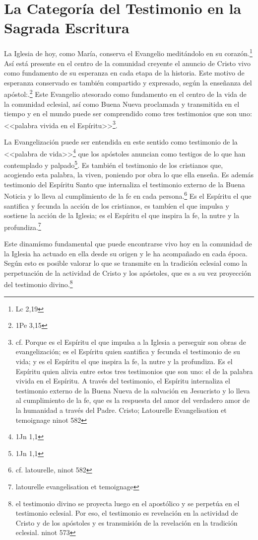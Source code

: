 \section{La Categoría del Testimonio en la Sagrada Escritura}
La Iglesia de hoy, como María, conserva el Evangelio meditándolo en su
corazón.\footnote{Lc 2,19} Así está presente en el centro de la comunidad
creyente el anuncio de Cristo vivo como fundamento de su esperanza en cada etapa
de la historia. Este motivo de esperanza conservado es también compartido y
expresado, según la enseñanza del apóstol:.\footnote{1Pe 3,15} Este Evangelio
atesorado como fundamento en el centro de la vida de la comunidad eclesial, así
como Buena Nueva proclamada y transmitida en el tiempo y en el mundo puede ser
comprendido como tres testimonios que son uno:<<palabra vivida en el
Espíritu>>\footnote{cf. Porque es el Espíritu el que impulsa a la Iglesia a
  perseguir son obras de evangelización; es el Espíritu quien santifica y
  fecunda el testimonio de su vida; y es el Espíritu el que inspira la fe, la
  nutre y la profundiza. Es el Espíritu quien alivia entre estos tres
  testimonios que son uno: el de la palabra vivida en el Espíritu. A través del
  testimonio, el Espíritu internaliza el testimonio externo de la Buena Nueva de
  la salvación en Jesucristo y lo lleva al cumplimiento de la fe, que es la
  respuesta del amor del verdadero amor de la humanidad a través del Padre.
  Cristo; Latourelle Evangelisation et temoignage ninot 582}.

La Evangelización puede ser entendida en este sentido como testimonio de la
<<palabra de vida>>\footnote{1Jn 1,1} que los apóstoles anuncian como testigos
de lo que han contemplado y palpado\footnote{1Jn 1,1}. Es también el testimonio
de los cristianos que, acogiendo esta palabra, la viven,
poniendo por obra lo que ella enseña. Es además testimonio del Espíritu Santo
que internaliza el testimonio externo de la Buena Noticia y lo lleva al
cumplimiento de la fe en cada persona.\footnote{cf. latourelle, ninot 582} Es el
Espíritu el que santifica y fecunda la acción de los cristianos, es tambíen el
que impulsa y sostiene la acción de la Iglesia; es el Espíritu el que inspira la
fe, la nutre y la profundiza.\footnote{latourelle evangelisation et temoignage}

Este dinamísmo fundamental que puede encontrarse vivo hoy en la comunidad de la
Iglesia ha actuado en ella desde su origen y le ha acompañado en cada época.
Según esto es posible valorar lo que se transmite en la tradición eclesial como
la perpetuación de la actividad de Cristo y los apóstoles, que es a su vez
proyección del testimonio divino.\footnote{ el testimonio divino se proyecta
  luego en el apostólico y se perpetúa en el testimonio eclesial. Por eso, el
  testimonio es revelación en la actividad de Cristo y de los apóstoles y es
  transmisión de la revelación en la tradición eclesial. ninot 573}

